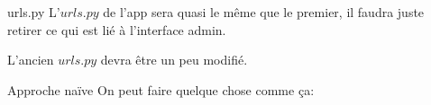 \documentclass{beamer}
\begin{document}
\begin{frame}[fragile]{urls.py}
    L'$urls.py$ de l'app sera quasi le même que le premier, il faudra juste retirer ce qui est lié à l'interface admin.

    \vspace{3mm}
    L'ancien $urls.py$ devra être un peu modifié.
\end{frame}

\begin{frame}[fragile]{Approche naïve}
    On peut faire quelque chose comme ça:
\end{frame}











\end{document}

